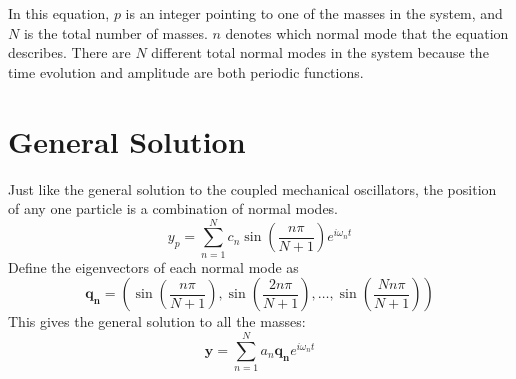 \documentclass[11pt]{article}
\begin{document}
	In this equation, $p$ is an integer pointing to one of the masses in the system, and $N$ is the total number of masses. $n$ denotes which normal mode that the equation describes. There are $N$ different total normal modes in the system because the time evolution and amplitude are both periodic functions.
	
\section{General Solution}
	Just like the general solution to the coupled mechanical oscillators, the position of any one particle is a combination of normal modes.
	\begin{equation}
		y_p = \sum_{n=1}^N c_n \sin\left(\frac{n\pi}{N+1}\right) e^{i\omega_n t}
	\end{equation}
	Define the eigenvectors of each normal mode as
	\begin{equation}
		\mathbf{q_n} = \left( \sin \left(\frac{n\pi}{N+1}\right), \sin \left(\frac{2n\pi}{N+1}\right), \ldots , \sin \left(\frac{Nn\pi}{N+1}\right) \right)
	\end{equation}
	This gives the general solution to all the masses:
	\begin{equation}
		\mathbf{y} = \sum_{n=1}^N a_n \mathbf{q_n} e^{i\omega_n t}
	\end{equation}
%		
%		


\end{document}
